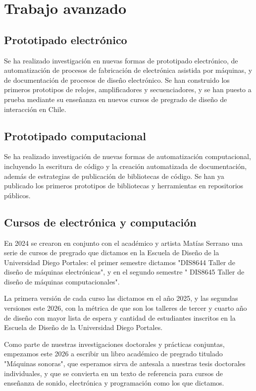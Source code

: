 \documentclass[../proyecto.tex]{subfiles}
\begin{document}
\section{Trabajo avanzado}


\subsection{Prototipado electrónico}

Se ha realizado investigación en nuevas formas de prototipado electrónico, de automatización de procesos de fabricación de electrónica asistida por máquinas, y de documentación de procesos de diseño electrónico. Se han construido los primeros prototipos de relojes, amplificadores y secuenciadores, y se han puesto a prueba mediante su enseñanza en nuevos cursos de pregrado de diseño de interacción en Chile.

\subsection{Prototipado computacional}

Se ha realizado investigación de nuevas formas de automatización computacional, incluyendo la escritura de código y la creación automatizada de documentación, además de estrategias de publicación de bibliotecas de código. Se han ya publicado los primeros prototipos de bibliotecas y herramientas en repositorios públicos.

\subsection{Cursos de electrónica y computación}

En 2024 se crearon en conjunto con el académico y artista Matías Serrano una serie de cursos de pregrado que dictamos en la Escuela de Diseño de la Universidad Diego Portales: el primer semestre dictamos "DIS8644 Taller de diseño de máquinas electrónicas", y en el segundo semestre " DIS8645 Taller de diseño de máquinas computacionales".

La primera versión de cada curso las dictamos en el año 2025, y las segundas versiones este 2026, con la métrica de que son los talleres de tercer y cuarto año de diseño con mayor lista de espera y cantidad de estudiantes inscritos en la Escuela de Diseño de la Universidad Diego Portales.

Como parte de nuestras investigaciones doctorales y prácticas conjuntas, empezamos este 2026 a escribir un libro académico de pregrado titulado "Máquinas sonoras", que esperamos sirva de antesala a nuestras tesis doctorales individuales, y que se convierta en un texto de referencia para cursos de enseñanza de sonido, electrónica y programación como los que dictamos.
\end{document}
